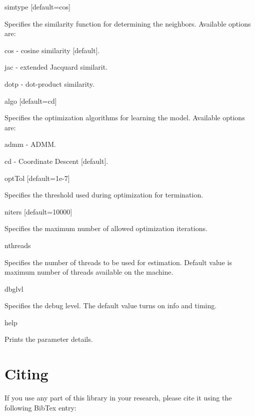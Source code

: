 \begin{DoxyItemize}
\begin{DoxyItemize}
\end{DoxyItemize}
\item simtype \mbox{[}default=cos\mbox{]}
\begin{DoxyItemize}
\item Specifies the similarity function for determining the neighbors. Available options are\+:
\begin{DoxyItemize}
\item cos -\/ cosine similarity \mbox{[}default\mbox{]}.
\item jac -\/ extended Jacquard similarit.
\item dotp -\/ dot-\/product similarity.
\end{DoxyItemize}
\end{DoxyItemize}
\item algo \mbox{[}default=cd\mbox{]}
\begin{DoxyItemize}
\item Specifies the optimization algorithms for learning the model. Available options are\+:
\begin{DoxyItemize}
\item admm -\/ A\+D\+MM.
\item cd -\/ Coordinate Descent \mbox{[}default\mbox{]}.
\end{DoxyItemize}
\end{DoxyItemize}
\item opt\+Tol \mbox{[}default=1e-\/7\mbox{]}
\begin{DoxyItemize}
\item Specifies the threshold used during optimization for termination.
\end{DoxyItemize}
\item niters \mbox{[}default=10000\mbox{]}
\begin{DoxyItemize}
\item Specifies the maximum number of allowed optimization iterations.
\end{DoxyItemize}
\item nthreads
\begin{DoxyItemize}
\item Specifies the number of threads to be used for estimation. Default value is maximum number of threads available on the machine.
\end{DoxyItemize}
\item dbglvl
\begin{DoxyItemize}
\item Specifies the debug level. The default value turns on info and timing.
\end{DoxyItemize}
\item help
\begin{DoxyItemize}
\item Prints the parameter details.
\end{DoxyItemize}
\end{DoxyItemize}\hypertarget{index_Citing}{}\section{Citing}\label{index_Citing}
If you use any part of this library in your research, please cite it using the following Bib\+Tex entry\+:

